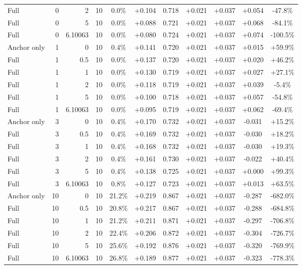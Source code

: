 \begin{table}[htbp]
\begin{tabular}{lrrrccccccc}
Full & 0 & 2 & 10 & 0.0\% & +0.104 & 0.718 & +0.021 & +0.037 & +0.054 & -47.8\% \\
Full & 0 & 5 & 10 & 0.0\% & +0.088 & 0.721 & +0.021 & +0.037 & +0.068 & -84.1\% \\
Full & 0 & 6.10063 & 10 & 0.0\% & +0.080 & 0.724 & +0.021 & +0.037 & +0.074 & -100.5\% \\
Anchor only & 1 & 0 & 10 & 0.4\% & +0.141 & 0.720 & +0.021 & +0.037 & +0.015 & +59.9\% \\
Full & 1 & 0.5 & 10 & 0.0\% & +0.137 & 0.720 & +0.021 & +0.037 & +0.020 & +46.2\% \\
Full & 1 & 1 & 10 & 0.0\% & +0.130 & 0.719 & +0.021 & +0.037 & +0.027 & +27.1\% \\
Full & 1 & 2 & 10 & 0.0\% & +0.118 & 0.719 & +0.021 & +0.037 & +0.039 & -5.4\% \\
Full & 1 & 5 & 10 & 0.0\% & +0.100 & 0.718 & +0.021 & +0.037 & +0.057 & -54.8\% \\
Full & 1 & 6.10063 & 10 & 0.0\% & +0.095 & 0.719 & +0.021 & +0.037 & +0.062 & -69.4\% \\
Anchor only & 3 & 0 & 10 & 0.4\% & +0.170 & 0.732 & +0.021 & +0.037 & -0.031 & +15.2\% \\
Full & 3 & 0.5 & 10 & 0.4\% & +0.169 & 0.732 & +0.021 & +0.037 & -0.030 & +18.2\% \\
Full & 3 & 1 & 10 & 0.4\% & +0.168 & 0.732 & +0.021 & +0.037 & -0.030 & +19.3\% \\
Full & 3 & 2 & 10 & 0.4\% & +0.161 & 0.730 & +0.021 & +0.037 & -0.022 & +40.4\% \\
Full & 3 & 5 & 10 & 0.4\% & +0.138 & 0.725 & +0.021 & +0.037 & +0.000 & +99.3\% \\
Full & 3 & 6.10063 & 10 & 0.8\% & +0.127 & 0.723 & +0.021 & +0.037 & +0.013 & +63.5\% \\
Anchor only & 10 & 0 & 10 & 21.2\% & +0.219 & 0.867 & +0.021 & +0.037 & -0.287 & -682.0\% \\
Full & 10 & 0.5 & 10 & 20.8\% & +0.217 & 0.867 & +0.021 & +0.037 & -0.288 & -684.8\% \\
Full & 10 & 1 & 10 & 21.2\% & +0.211 & 0.871 & +0.021 & +0.037 & -0.297 & -706.8\% \\
Full & 10 & 2 & 10 & 22.4\% & +0.206 & 0.872 & +0.021 & +0.037 & -0.304 & -726.7\% \\
Full & 10 & 5 & 10 & 25.6\% & +0.192 & 0.876 & +0.021 & +0.037 & -0.320 & -769.9\% \\
Full & 10 & 6.10063 & 10 & 26.8\% & +0.189 & 0.877 & +0.021 & +0.037 & -0.323 & -778.3\% \\

\end{tabular}
\end{table}
